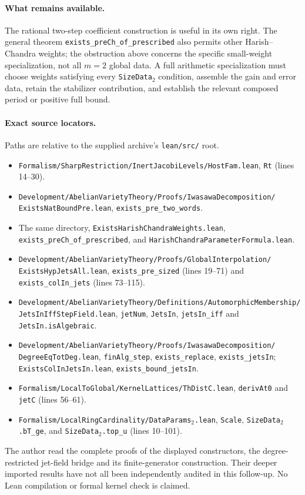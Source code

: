 \paragraph{What remains available.}
The rational two-step coefficient construction is useful in its own
right.  The general theorem
\texttt{exists\_preCh\_of\_prescribed} also permits other
Harish--Chandra weights; the obstruction above concerns the specific
small-weight specialization, not all $m=2$ global data.  A full
arithmetic specialization must choose weights satisfying every
\texttt{SizeData$_2$} condition, assemble the gain and error data,
retain the stabilizer contribution, and establish the relevant
composed period or positive full bound.

\paragraph{Exact source locators.}
Paths are relative to the supplied archive's \texttt{lean/src/} root.
\begin{itemize}
\item \texttt{Formalism/SharpRestriction/InertJacobiLevels/HostFam.lean},
      \texttt{Rt} (lines 14--30).
\item \texttt{Development/AbelianVarietyTheory/Proofs/IwasawaDecomposition/
      ExistsNatBoundPre.lean}, \texttt{exists\_pre\_two\_words}.
\item The same directory,
      \texttt{ExistsHarishChandraWeights.lean},
      \texttt{exists\_preCh\_of\_prescribed}, and
      \texttt{HarishChandraParameterFormula.lean}.
\item \texttt{Development/AbelianVarietyTheory/Proofs/GlobalInterpolation/
      ExistsHypJetsAll.lean}, \texttt{exists\_pre\_sized} (lines 19--71)
      and \texttt{exists\_colIn\_jets} (lines 73--115).
\item \texttt{Development/AbelianVarietyTheory/Definitions/AutomorphicMembership/
      JetsInIffStepField.lean}, \texttt{jetNum}, \texttt{JetsIn},
      \texttt{jetsIn\_iff} and \texttt{JetsIn.isAlgebraic}.
\item \texttt{Development/AbelianVarietyTheory/Proofs/IwasawaDecomposition/
      DegreeEqTotDeg.lean}, \texttt{finAlg\_step},
      \texttt{exists\_replace}, \texttt{exists\_jetsIn};
      \texttt{ExistsColInJetsIn.lean}, \texttt{exists\_bound\_jetsIn}.
\item \texttt{Formalism/LocalToGlobal/KernelLattices/ThDistC.lean},
      \texttt{derivAt0} and \texttt{jetC} (lines 56--61).
\item \texttt{Formalism/LocalRingCardinality/DataParams$_2$.lean},
      \texttt{Scale}, \texttt{SizeData$_2$.bT\_ge}, and
      \texttt{SizeData$_2$.top\_u} (lines 10--101).
\end{itemize}
The author read the complete proofs of the displayed constructors,
the degree-restricted jet-field bridge and its finite-generator
construction.  Their deeper imported results have not all been
independently audited in this follow-up.  No Lean compilation or
formal kernel check is claimed.
